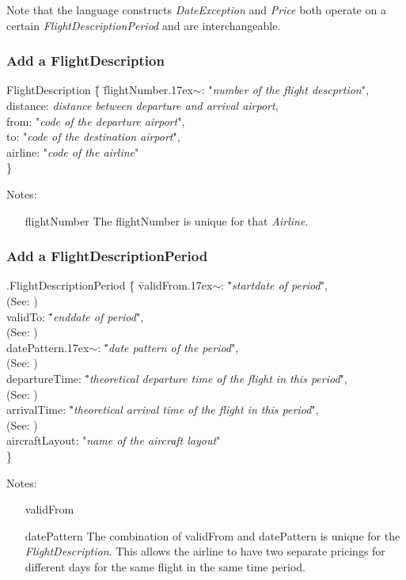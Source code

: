 \documentclass[a4paper,11pt]{article}
\newcommand{\dsltype}[1]{\textit{#1}}
\newcommand{\mytilde}{{\raise.17ex\hbox{\(\scriptstyle\sim\)}}}
\begin{document}
Note that the language constructs \dsltype{DateException} and \dsltype{Price} both operate on a certain \dsltype{FlightDescriptionPeriod} and are interchangeable.

\subsubsection*{Add a FlightDescription}
\begin{tabbing}
FlightDescription \= \{ \= flightNumber\mytilde: "\textit{number of the flight descprtion}", \\
	\> \> distance: \textit{distance between departure and arrival airport}, \\
	\> \> from: "\textit{code of the departure airport}", \\
	\> \> to: "\textit{code of the destination airport}", \\
	\> \> airline: "\textit{code of the airline}" \\
\> \} \\
\end{tabbing}
Notes:
\begin{enumerate}
\item[flightNumber] The flightNumber is unique for that \dsltype{Airline}.
\end{enumerate}

\subsubsection*{Add a FlightDescriptionPeriod}
\begin{tabbing}
.FlightDescriptionPeriod \= \{ \= validFrom\mytilde: \= "\textit{startdate of period}", \\
		\> \> \>(See: ) \\
	\> \> validTo: \= "\textit{enddate of period}", \\
		\> \> \>(See: ) \\
	\> \> datePattern\mytilde: \= "\textit{date pattern of the period}", \\
		\> \> \>(See: ) \\
	\> \> departureTime: \= "\textit{theoretical departure time of the flight in this period}", \\
		\> \> \>(See: ) \\
	\> \> arrivalTime: \= "\textit{theoretical arrival time of the flight in this period}", \\
		\> \> \>(See: ) \\
	\> \> aircraftLayout: "\textit{name of the aircraft layout}" \\
\> \} \\
\end{tabbing}
Notes:
\begin{enumerate}
\item[validFrom]
\item[datePattern] The combination of validFrom and datePattern is unique for the \dsltype{FlightDescription}.
This allows the airline to have two separate pricings for different days for the same flight in the same time period.
\end{enumerate}
\end{document}
